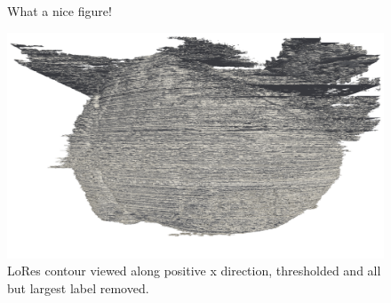 \begin{figure}
      \caption{What a nice figure!}
      \label{fig:LoRes_cross_sections}
    \end{figure}
    
    \begin{figure}
      \centering
      \includegraphics[width=\textheight]{Ch6/Figs/Rat28/contours/LoRes_positive_x}
      \caption{LoRes contour viewed along positive x direction, thresholded and all but largest label removed.}
      \label{fig:LoRes_positive_x}
    \end{figure}
    
